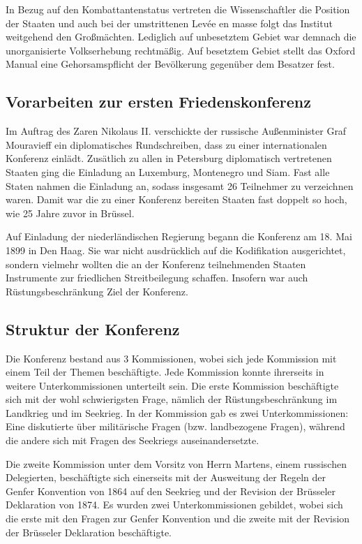 \documentclass[12pt]{scrartcl}
\begin{document}
In Bezug auf den Kombattantenstatus vertreten die Wissenschaftler die Position der Staaten und auch bei der umstrittenen Levée en masse folgt das Institut weitgehend den Großmächten. Lediglich auf unbesetztem Gebiet war demnach die unorganisierte Volkserhebung rechtmäßig. Auf besetztem Gebiet stellt das Oxford Manual eine Gehorsamspflicht der Bevölkerung gegenüber dem Besatzer fest.\cite{Buss1992}

\subsection{Vorarbeiten zur ersten Friedenskonferenz}

Im Auftrag des Zaren Nikolaus II. verschickte der russische Außenminister Graf Mouravieff ein diplomatisches Rundschreiben, dass zu einer internationalen Konferenz einlädt. Zusätlich zu allen in Petersburg diplomatisch vertretenen Staaten ging die Einladung an Luxemburg, Montenegro und Siam. Fast alle Staten nahmen die Einladung an, sodass insgesamt 26 Teilnehmer zu verzeichnen waren. Damit war die zu einer Konferenz bereiten Staaten fast doppelt so hoch, wie 25 Jahre zuvor in Brüssel.\cite{Buss1992}

Auf Einladung der niederländischen Regierung begann die Konferenz am 18. Mai 1899 in Den Haag. Sie war nicht ausdrücklich auf die Kodifikation ausgerichtet, sondern vielmehr wollten die an der Konferenz teilnehmenden Staaten Instrumente zur friedlichen Streitbeilegung schaffen. Insofern war auch Rüstungsbeschränkung Ziel der Konferenz.

\subsection{Struktur der Konferenz}

Die Konferenz bestand aus 3 Kommissionen, wobei sich jede Kommission mit einem Teil der Themen beschäftigte. Jede Kommission konnte ihrerseits in weitere Unterkommissionen unterteilt sein. Die erste Kommission beschäftigte sich mit der wohl schwierigsten Frage, nämlich der Rüstungsbeschränkung im Landkrieg und im Seekrieg. In der Kommission gab es zwei Unterkommissionen: Eine diskutierte über militärische Fragen (bzw. landbezogene Fragen), während die andere sich mit Fragen des Seekriegs auseinandersetzte.\cite{Scott1920}

Die zweite Kommission unter dem Vorsitz von Herrn Martens, einem russischen Delegierten, beschäftigte sich einerseits mit der Ausweitung der Regeln der Genfer Konvention von 1864 auf den Seekrieg und der Revision der Brüsseler Deklaration von 1874. Es wurden zwei Unterkommissionen gebildet, wobei sich die erste mit den Fragen zur Genfer Konvention und die zweite mit der Revision der Brüsseler Deklaration beschäftigte.\cite{Scott1920}
\end{document}

